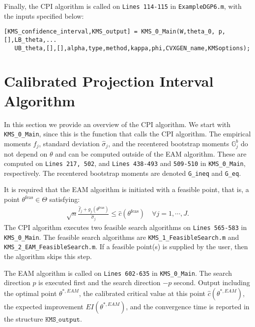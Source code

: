 \documentclass[12pt]{article}
\def\code#1{\texttt{#1}}
\begin{document}
Finally, the CPI algorithm is called on \code{Lines 114-115} in \code{ExampleDGP6.m}, with the inputs specified below:
\footnotesize
\begin{lstlisting}[backgroundcolor = \color{gray!30},
                   xleftmargin = 0cm,
                   framexleftmargin = 1em]
[KMS_confidence_interval,KMS_output] = KMS_0_Main(W,theta_0, p,[],LB_theta,...
   UB_theta,[],[],alpha,type,method,kappa,phi,CVXGEN_name,KMSoptions);
\end{lstlisting} \normalsize


\section{Calibrated Projection Interval Algorithm} \label{sec:algorithm}
In this section we provide an overview of the CPI algorithm.  We start with \code{KMS\_0\_Main}, since this is the function that calls the CPI algorithm.  The empirical moments $\hat f_j$, standard deviation $\hat \sigma_j$, and the recentered bootstrap moments $\mathbb{G}_j^b$ do not depend on $\theta$ and can be computed outside of the EAM algorithm.  These are computed on \code{Lines 217, 502}, and \code{Lines 438-493} and \code{509-510} in \code{KMS\_0\_Main}, respectively.  The recentered bootstrap moments are denoted \code{G\_ineq} and \code{G\_eq}.

It is required that the EAM algorithm is initiated with a feasible point, that is, a point $\theta^{\text{feas}} \in \Theta$ satisfying:
\begin{align*}
\sqrt{n} \frac{\hat f_j + g_j(\theta^{\text{feas}})}{\hat \sigma_j} \leq \hat c(\theta^{\text{feas}}) \quad \forall j=1,\cdots,J.
\end{align*}
The CPI algorithm executes two feasible search algorithms on \code{Lines 565-583}  in \code{KMS\_0\_Main}.  The feasible search algorithms are \code{KMS\_1\_FeasibleSearch.m} and \code{KMS\_2\_EAM\_FeasibleSearch.m}.  If a feasible point(s) is supplied by the user, then the algorithm skips this step.

The EAM algorithm is called on \code{Lines 602-635} in \code{KMS\_0\_Main}.  The search direction $p$ is executed first and the search direction $-p$ second.  Output including the optimal point $\theta^{*,EAM}$, the calibrated critical value at this point $\hat c(\theta^{*,EAM})$, the expected improvement $EI(\theta^{*,EAM})$, and the convergence time is reported in the structure $\code{KMS\_output}$.
\end{document}
